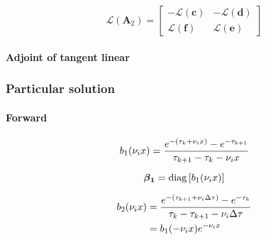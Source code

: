 \begin{equation}
\mathcal{L}(\mathbf{A}_{2}) =
\left[
\begin{array}{rr}
-\mathcal{L}(\mathbf{c}) & -\mathcal{L}(\mathbf{d}) \\
 \mathcal{L}(\mathbf{f}) &  \mathcal{L}(\mathbf{e})
\end{array}
\right]
\label{eq:mem-layer_quantities-homogeneous_solution-tangent_linear-A2_l}
\end{equation}


%
\paragraph{Adjoint of tangent linear}
\label{sec:mem-layer_quantities-homogeneous_solution-adjoint_of_tangent_linear}


%
\subsubsection{Particular solution}
\label{sec:mem-layer_quantities-particular_solution}


\paragraph{Forward}
\label{sec:mem-layer_quantities-particular_solution-forward}

\begin{equation}
b_{1}(\nu_{i}x) = \frac{e^{-(\tau_{k} + \nu_{i}x)} - e^{-\tau_{k+1}}}{\tau_{k+1} - \tau_{k} - \nu_{i}x}
\label{eq:mem-layer_quantities-particular_solution-forward-b1}
\end{equation}

\begin{equation}
\boldsymbol{\beta_{1}} = \mathrm{diag}\left[b_{1}(\nu_{i}x)\right]
\label{eq:mem-layer_quantities-particular_solution-forward-beta1}
\end{equation}

\begin{align}
b_{2}(\nu_{i}x) &= \frac{e^{-(\tau_{k+1} + \nu_{i}\Delta\tau)} - e^{-\tau_{k}}}{\tau_{k} - \tau_{k+1} - \nu_{i}\Delta\tau} \\
                                &= b_{1}(-\nu_{i}x)e^{-\nu_{i}x}
\label{eq:mem-layer_quantities-particular_solution-forward-b2}
\end{align}

